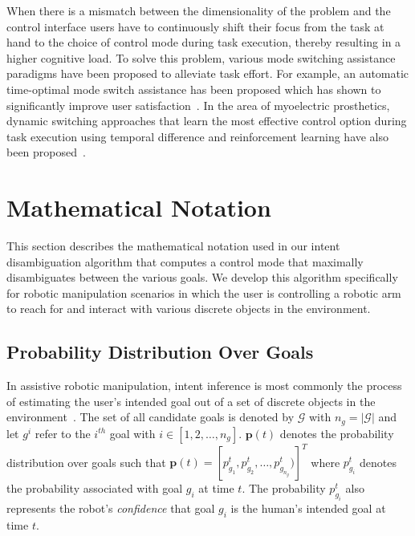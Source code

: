 \documentclass[conference]{IEEEtran}
\begin{document}
When there is a mismatch between the dimensionality of the problem and the control interface users have to continuously shift their focus from the task at hand to the choice of control mode during task execution, thereby resulting in a higher cognitive load. To solve this problem, various mode switching assistance paradigms have been proposed to alleviate task effort. For example, an automatic time-optimal mode switch assistance has been proposed which has shown to significantly improve user satisfaction~\citep{herlant2016assistive}. In the area of myoelectric prosthetics, dynamic switching approaches that learn the most effective control option during task execution using temporal difference and reinforcement learning have also been proposed~\cite{pilarski2012dynamic}. 


\section{Mathematical Notation}\label{sec:math}
This section describes the mathematical notation used in our intent disambiguation algorithm that computes a control mode that maximally disambiguates between the various goals.
We develop this algorithm specifically for robotic manipulation scenarios in which the user is controlling a robotic arm to reach for and interact with various discrete objects in the environment.

\subsection{Probability Distribution Over Goals}\label{ssec:notation}
 In assistive robotic manipulation, intent inference is most commonly the process of estimating the user's intended goal out of a set of discrete objects in the environment~\citep{calli2015ycb}. The set of all candidate goals is denoted by $\mathcal{G}$ with $n_g = \vert\mathcal{G}\vert$ and let $g^i$ refer to the $i^{th}$ goal with $i \in [1,2,\dots, n_g]$. 
$\boldsymbol{p}(t)$ denotes the probability distribution over goals such that $\boldsymbol{p}(t) = [p_{g_1}^t, p_{g_2}^t,\dots, p_{g_{n_g}}^t)]^{T}$ where $p_{g_i}^t$ denotes the probability associated with goal $g_i$ at time $t$.  The probability $p_{g_i}^t$  also represents the robot's \textit{confidence} that goal $g_i$ is the human's intended goal at time $t$. 
\end{document}
